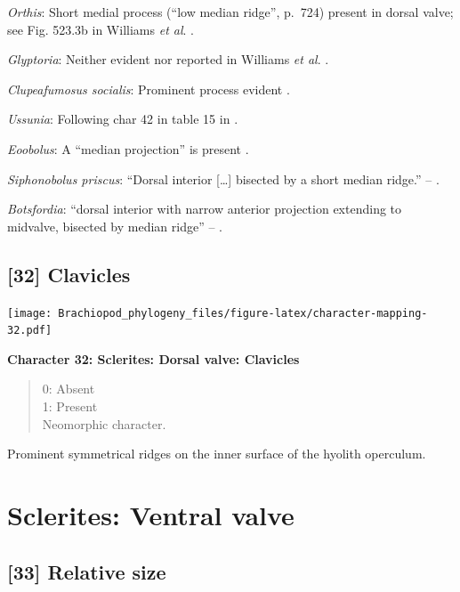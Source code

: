 \documentclass[]{book}
\theoremstyle{definition}
\theoremstyle{definition}
\theoremstyle{definition}
\theoremstyle{remark}
\begin{document}
\emph{Orthis}: Short medial process (``low median ridge'', p.~724)
present in dorsal valve; see Fig. 523.3b in Williams \emph{et al}.
\citeyearpar{Williams2000BrachiopodaLinguliformea}.

\emph{Glyptoria}: Neither evident nor reported in Williams \emph{et al}.
\citeyearpar{Williams2000BrachiopodaLinguliformea}.

\emph{Clupeafumosus socialis}: Prominent process evident
\citep{Topper2013Reappraisalof}.

\emph{Ussunia}: Following char 42 in table 15 in
\citet{Williams2000BrachiopodaLinguliformea}.

\emph{Eoobolus}: A ``median projection'' is present \citep[fig. 4g
in][]{Balthasar2009Thebrachiopod}.

\emph{Siphonobolus priscus}: ``Dorsal interior {[}\ldots{}{]} bisected
by a short median ridge.'' -- \citet{Popov2009Earlyontogeny}.

\emph{Botsfordia}: ``dorsal interior with narrow anterior projection
extending to midvalve, bisected by median ridge'' --
\citet{Williams2000BrachiopodaLinguliformea}.

\hypertarget{clavicles}{%
\subsection*{{[}32{]} Clavicles}\label{clavicles}}

\texttt{[image: Brachiopod\_phylogeny\_files/figure-latex/character-mapping-32.pdf]}

\textbf{Character 32: Sclerites: Dorsal valve: Clavicles}

\begin{quote}
0: Absent\\
1: Present\\
Neomorphic character.
\end{quote}

Prominent symmetrical ridges on the inner surface of the hyolith
operculum.

\hypertarget{sclerites-ventral-valve}{%
\section{Sclerites: Ventral valve}\label{sclerites-ventral-valve}}

\hypertarget{relative-size}{%
\subsection*{{[}33{]} Relative size}\label{relative-size}}
\end{document}
